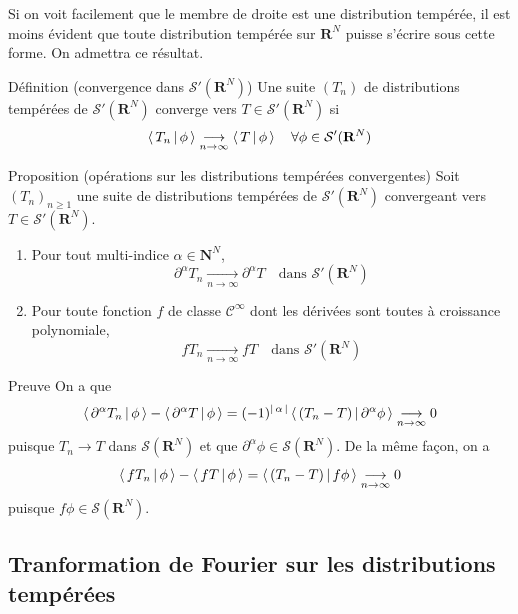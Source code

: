         Si on voit facilement que le membre de droite est une distribution tempérée, il est moins évident que toute distribution tempérée sur $\mathbf{R}^N$ puisse s’écrire sous cette forme. On admettra ce résultat.

        \begin{omed}{Définition (convergence dans $\mathcal{S}'(\mathbf{R}^N)$)}
            Une suite $(T_n)$ de distributions tempérées de $\mathcal{S}'(\mathbf{R}^N)$ converge vers $T \in \mathcal{S}'(\mathbf{R}^N)$ si 
            \[ \left< \, T_n \, \middle| \, \phi \, \right> \underset{n \to \infty}{\longrightarrow} \left< \, T \, \middle| \, \phi \, \right> \quad \forall \phi \in \mathcal{S}'(\mathbf{R}^N) \]   
        \end{omed}

        \begin{omed}{Proposition (opérations sur les distributions tempérées convergentes)}
            Soit $(T_n)_{n \geq 1}$ une suite de distributions tempérées de $\mathcal{S}'(\mathbf{R}^N)$ convergeant vers $T \in \mathcal{S}'(\mathbf{R}^N)$. 
            \begin{enumerate}[label=($p_{\arabic*}$)]
                \item Pour tout multi-indice $\alpha \in \mathbf{N}^N$, 
                \[ \partial^{\alpha} T_n \underset{n \to \infty}{\longrightarrow} \partial^{\alpha} T \quad \text{dans } \mathcal{S}'(\mathbf{R}^N) \]   
                \item Pour toute fonction $f$ de classe $\mathcal{C}^{\infty}$ dont les dérivées sont toutes à croissance polynomiale, 
                \[ f T_n \underset{n \to \infty}{\longrightarrow} f T \quad \text{dans } \mathcal{S}'(\mathbf{R}^N) \]
            \end{enumerate}
        \end{omed}

        \begin{demo}{Preuve}
            On a que 
            \[ \left< \, \partial^{\alpha} T_n \, \middle| \, \phi \, \right> - \left< \, \partial^{\alpha} T \, \middle| \, \phi \, \right> = (-1)^{\left\lvert \, \alpha \, \right\rvert}\left< \, (T_n - T) \, \middle| \, \partial^{\alpha} \phi \, \right> \underset{n \to \infty}{\longrightarrow} 0 \]    
            puisque $T_n \to T$ dans $\mathcal{S}(\mathbf{R}^N)$ et que $\partial^{\alpha}\phi \in \mathcal{S}(\mathbf{R}^N)$. De la même façon, on a 
            \[ \left< \, f T_n \, \middle| \, \phi \, \right> - \left< \, fT \, \middle| \, \phi \, \right> = \left< \, (T_n - T) \, \middle| \, f\phi \, \right> \underset{n \to \infty}{\longrightarrow} 0 \]   
            puisque $f\phi \in \mathcal{S}(\mathbf{R}^N)$.
        \end{demo}

    \subsection{Tranformation de Fourier sur les distributions tempérées}

